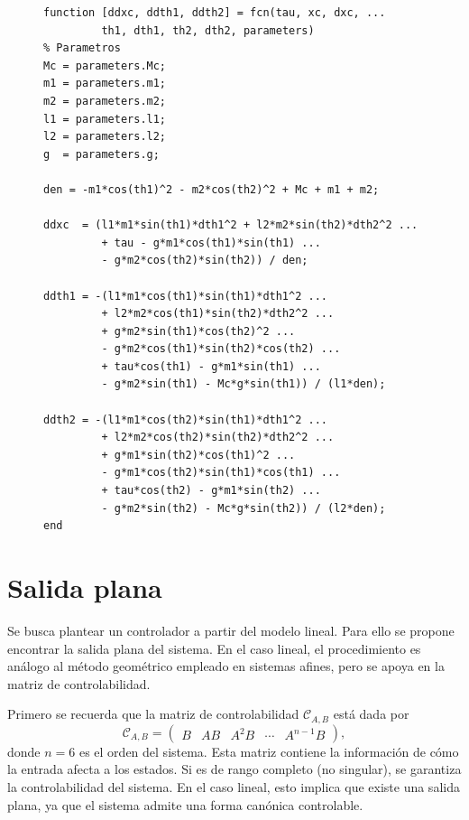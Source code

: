 \documentclass[conference]{IEEEtran}
\begin{document}
\begin{figure}[H]
\lstset{style=matlabstyle}
\begin{lstlisting}[caption={Función de MATLAB que implementa la dinámica no lineal del sistema, despejada para las aceleraciones generalizadas.}, label={lst:fcn_dinamica}]
function [ddxc, ddth1, ddth2] = fcn(tau, xc, dxc, ...
         th1, dth1, th2, dth2, parameters)
% Parametros
Mc = parameters.Mc;
m1 = parameters.m1;
m2 = parameters.m2;
l1 = parameters.l1;
l2 = parameters.l2;
g  = parameters.g;

den = -m1*cos(th1)^2 - m2*cos(th2)^2 + Mc + m1 + m2;

ddxc  = (l1*m1*sin(th1)*dth1^2 + l2*m2*sin(th2)*dth2^2 ...
         + tau - g*m1*cos(th1)*sin(th1) ...
         - g*m2*cos(th2)*sin(th2)) / den;

ddth1 = -(l1*m1*cos(th1)*sin(th1)*dth1^2 ...
         + l2*m2*cos(th1)*sin(th2)*dth2^2 ...
         + g*m2*sin(th1)*cos(th2)^2 ...
         - g*m2*cos(th1)*sin(th2)*cos(th2) ...
         + tau*cos(th1) - g*m1*sin(th1) ...
         - g*m2*sin(th1) - Mc*g*sin(th1)) / (l1*den);

ddth2 = -(l1*m1*cos(th2)*sin(th1)*dth1^2 ...
         + l2*m2*cos(th2)*sin(th2)*dth2^2 ...
         + g*m1*sin(th2)*cos(th1)^2 ...
         - g*m1*cos(th2)*sin(th1)*cos(th1) ...
         + tau*cos(th2) - g*m1*sin(th2) ...
         - g*m2*sin(th2) - Mc*g*sin(th2)) / (l2*den);
end
\end{lstlisting}
\end{figure}

\section{Salida plana}
Se busca plantear un controlador a partir del modelo lineal. Para ello se propone encontrar la salida plana del sistema. En el caso lineal, el procedimiento es análogo al método geométrico empleado en sistemas afines, pero se apoya en la matriz de controlabilidad.

Primero se recuerda que la matriz de controlabilidad $\mathcal{C}_{A,B}$ está dada por
\begin{equation}
	\mathcal{C}_{A,B} = \begin{pmatrix}
		B & AB & A^2 B & \cdots & A^{n-1} B
	\end{pmatrix},
\end{equation}
donde $n=6$ es el orden del sistema. Esta matriz contiene la información de cómo la entrada afecta a los estados. Si es de rango completo (no singular), se garantiza la controlabilidad del sistema. En el caso lineal, esto implica que existe una salida plana, ya que el sistema admite una forma canónica controlable.
\end{document}
